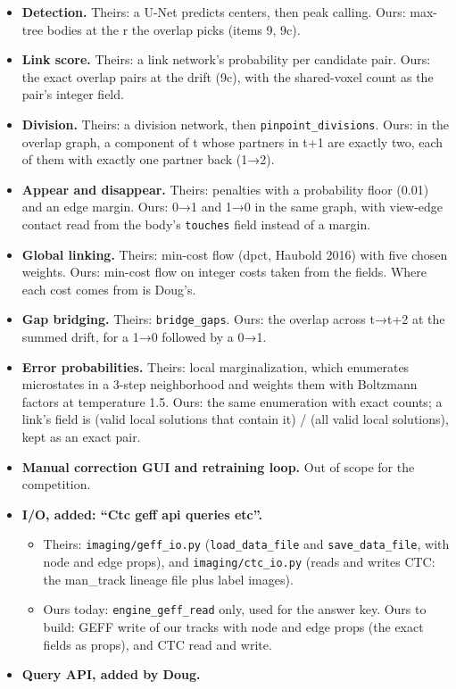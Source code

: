 \begin{itemize}
\item \textbf{Detection.} Theirs: a U-Net predicts centers, then peak calling. Ours: max-tree bodies at the r the overlap picks (items 9, 9c).
\item \textbf{Link score.} Theirs: a link network's probability per candidate pair. Ours: the exact overlap pairs at the drift (9c), with the shared-voxel count as the pair's integer field.
\item \textbf{Division.} Theirs: a division network, then \texttt{pinpoint\_\allowbreak{}divisions}. Ours: in the overlap graph, a component of t whose partners in t+1 are exactly two, each of them with exactly one partner back (1→2).
\item \textbf{Appear and disappear.} Theirs: penalties with a probability floor (0.01) and an edge margin. Ours: 0→1 and 1→0 in the same graph, with view-edge contact read from the body's \texttt{touches} field instead of a margin.
\item \textbf{Global linking.} Theirs: min-cost flow (dpct, Haubold 2016) with five chosen weights. Ours: min-cost flow on integer costs taken from the fields. Where each cost comes from is Doug's.
\item \textbf{Gap bridging.} Theirs: \texttt{bridge\_\allowbreak{}gaps}. Ours: the overlap across t→t+2 at the summed drift, for a 1→0 followed by a 0→1.
\item \textbf{Error probabilities.} Theirs: local marginalization, which enumerates microstates in a 3-step neighborhood and weights them with Boltzmann factors at temperature 1.5. Ours: the same enumeration with exact counts; a link's field is (valid local solutions that contain it) / (all valid local solutions), kept as an exact pair.
\item \textbf{Manual correction GUI and retraining loop.} Out of scope for the competition.
\item \textbf{I/O, added: “Ctc geff api queries etc”.}

\begin{itemize}
\item Theirs: \texttt{imaging/\allowbreak{}geff\_\allowbreak{}io.\allowbreak{}py} (\texttt{load\_\allowbreak{}data\_\allowbreak{}file} and \texttt{save\_\allowbreak{}data\_\allowbreak{}file}, with node and edge props), and \texttt{imaging/\allowbreak{}ctc\_\allowbreak{}io.\allowbreak{}py} (reads and writes CTC: the man\_\allowbreak{}track lineage file plus label images).
\item Ours today: \texttt{engine\_\allowbreak{}geff\_\allowbreak{}read} only, used for the answer key. Ours to build: GEFF write of our tracks with node and edge props (the exact fields as props), and CTC read and write.
\end{itemize}
\item \textbf{Query API, added by Doug.}


\end{itemize}
